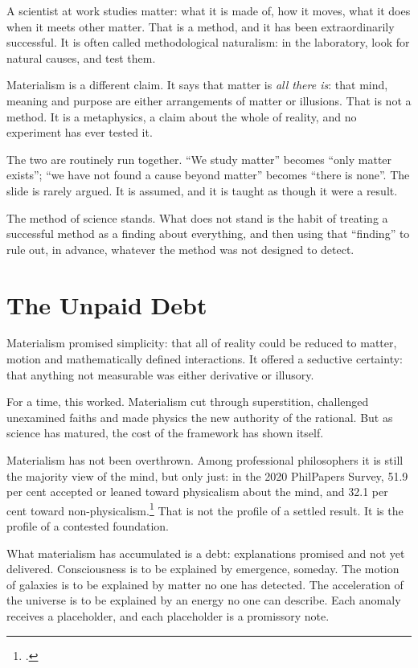 \documentclass[11pt,a4paper]{article}
\newcommand{\fn}[1]{\footnote{\citealp{#1}.}}
\begin{document}
A scientist at work studies matter: what it is made of, how it moves, what it does when it meets other matter. That is a method, and it has been extraordinarily successful. It is often called methodological naturalism: in the laboratory, look for natural causes, and test them.

Materialism is a different claim. It says that matter is \emph{all there is}: that mind, meaning and purpose are either arrangements of matter or illusions. That is not a method. It is a metaphysics, a claim about the whole of reality, and no experiment has ever tested it.

The two are routinely run together. ``We study matter'' becomes ``only matter exists''; ``we have not found a cause beyond matter'' becomes ``there is none''. The slide is rarely argued. It is assumed, and it is taught as though it were a result.

 The method of science stands. What does not stand is the habit of treating a successful method as a finding about everything, and then using that ``finding'' to rule out, in advance, whatever the method was not designed to detect.

\section{The Unpaid Debt}
\label{sec:debt}

Materialism promised simplicity: that all of reality could be reduced to matter, motion and mathematically defined interactions. It offered a seductive certainty: that anything not measurable was either derivative or illusory.

For a time, this worked. Materialism cut through superstition, challenged unexamined faiths and made physics the new authority of the rational. But as science has matured, the cost of the framework has shown itself.

Materialism has not been overthrown. Among professional philosophers it is still the majority view of the mind, but only just: in the 2020 PhilPapers Survey, 51.9 per cent accepted or leaned toward physicalism about the mind, and 32.1 per cent toward non-physicalism.\fn{bourget2023} That is not the profile of a settled result. It is the profile of a contested foundation.

What materialism has accumulated is a debt: explanations promised and not yet delivered. Consciousness is to be explained by emergence, someday. The motion of galaxies is to be explained by matter no one has detected. The acceleration of the universe is to be explained by an energy no one can describe. Each anomaly receives a placeholder, and each placeholder is a promissory note.
\end{document}
